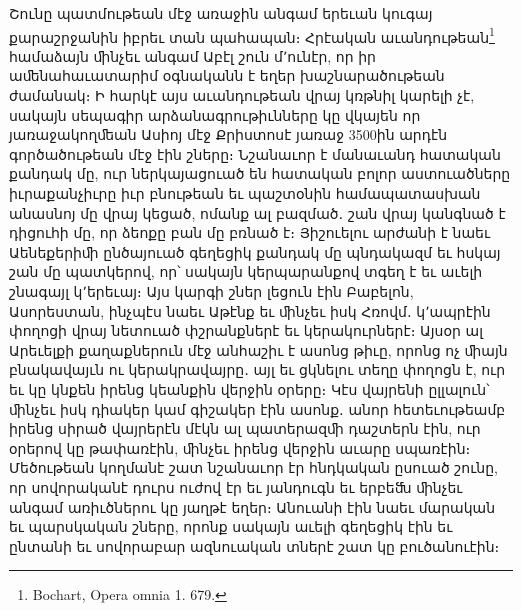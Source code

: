 \documentclass{article}
\begin{document}
{Շունը պատմութեան մէջ առաջին անգամ երեւան կուգայ քարաշրջանին իբրեւ տան պահապան։ Հրէական աւանդութեան\footnote{Bochart, Opera omnia 1. 679.} համաձայն ﬕնչեւ անգամ Աբէլ շուն մ՚ունէր, որ իր աﬔնահաւատարիմ օգնականն է եղեր խաշնարածութեան ժամանակ։ Ի հարկէ այս աւանդութեան վրայ կռթնիլ կարելի չէ, սակայն սեպագիր արձանագրութիւնները կը վկայեն որ յառաջակողﬔան Ասիոյ մէջ Քրիստոսէ յառաջ 3500ին արդէն գործածութեան մէջ էին շները։ Նշանաւոր է մանաւանդ հատական քանդակ մը, ուր ներկայացուած են հատական բոլոր աստուածները իւրաքանչիւրը իւր բնութեան եւ պաշտօնին համապատասխան անասնոյ մը վրայ կեցած, ոմանք ալ բազմած․ շան վրայ կանգնած է դիցուհի մը, որ ձեոքը բան մը բռնած է։ Յիշուելու արժանի է նաեւ Աենեքերիﬕ ընծայուած գեղեցիկ քանդակ մը պնդակազմ եւ հսկայ շան մը պատկերով, որ՝ սակայն կերպարանքով տգեղ է եւ աւելի շնագայլ կ՚երեւայ։ Այս կարգի շներ լեցուն էին Բաբելոն, Ասորեստան, ինչպէս նաեւ Աթէնք եւ ﬕնչեւ իսկ Հռովմ․ կ՚ապրէին փողոցի վրայ նետուած փշրանքներէ եւ կերակուրներէ։ Այսօր ալ Արեւելքի քաղաքներուն մէջ անհաշիւ է ասոնց թիւը, որոնց ոչ ﬕայն բնակավայւն ու կերակրավայրը․ այլ եւ ցկնելու տեղը փողոցն է, ուր եւ կը կնքեն իրենց կեանքին վերջին օրերը։ Կէս վայրենի ըլլալուն՝ ﬕնչեւ իսկ դիակեր կամ գիշակեր էին ասոնք․ անոր հետեւութեամբ իրենց սիրած վայրերէն մէկն ալ պատերազﬕ դաշտերն էին, ուր օրերով կը թափառէին, ﬕնչեւ իրենց վերջին աւարը սպառէին։ Մեծութեան կողմանէ շատ նշանաւոր էր հնդկական ըսուած շունը, որ սովորականէ դուրս ուժով էր եւ յանդուգն եւ երբեﬓ ﬕնչեւ անգամ առիւծներու կը յաղթէ եղեր։ Անուանի էին նաեւ մարական եւ պարսկական շները, որոնք սակայն աւելի գեղեցիկ էին եւ ընտանի եւ սովորաբար ազնուական տներէ շատ կը բուծանուէին։

}
\end{document}
